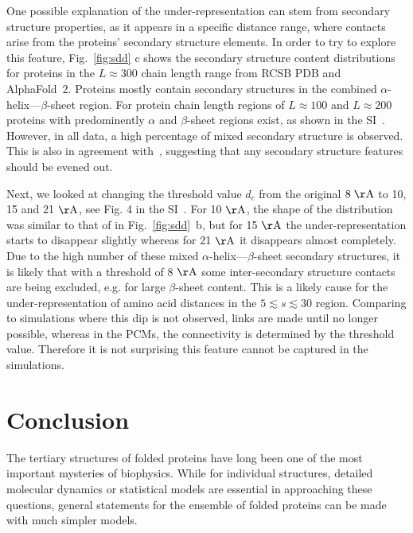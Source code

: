 \documentclass[
reprint,
twocolumn,
amsmath,amssymb,superscriptaddress,aps,
pre]{revtex4-1}
\begin{document}
One possible explanation of the under-representation can stem from secondary structure properties, as it appears in a specific distance range, where contacts arise from the proteins' secondary structure elements. In order to try to explore this feature, Fig.~\ref{fig:sdd} c shows the secondary structure content distributions for proteins in the $L\approx300$ chain length range from RCSB PDB and AlphaFold~2. Proteins mostly contain secondary structures in the combined $\alpha$-helix---$\beta$-sheet region. For protein chain length regions of $L\approx100$ and $L\approx200$ proteins with predominently $\alpha$ and $\beta$-sheet regions exist, as shown in the SI~\cite{SI}. However, in all data, a high percentage of mixed secondary structure is observed. This is also in agreement with~\cite{michie1996analysis}, suggesting that any secondary structure features should be evened out. 

Next, we looked at changing the threshold value $d_c$ from the original $8 \; \mathrm{\AA}$ to 10, 15 and 21 $\mathrm{\AA}$, see Fig. 4 in the SI~\cite{SI}. For 10 $\mathrm{\AA}$, the shape of the distribution was similar to that of in Fig.~\ref{fig:sdd}~b, but for 15 $\mathrm{\AA}$ the under-representation starts to disappear slightly whereas for 21 $\mathrm{\AA}$ it disappears almost completely. Due to the high number of these mixed $\alpha$-helix---$\beta$-sheet secondary structures, it is likely that with a threshold of 8 $\mathrm{\AA}$ some inter-secondary structure contacts are being excluded, e.g. for large $\beta$-sheet content. This is a likely cause for the under-representation of amino acid distances in the $5 \lesssim s \lesssim 30$ region. Comparing to simulations where this dip is not observed, links are made until no longer possible, whereas in the PCMs, the connectivity is determined by the threshold value. Therefore it is not surprising this feature cannot be captured in the simulations. 


\section{Conclusion}
The tertiary structures of folded proteins have long been one of the most important mysteries of biophysics. While for individual structures, detailed molecular dynamics or statistical models are essential in approaching these questions, general statements for the ensemble of folded proteins can be made with much simpler models.
\end{document}
